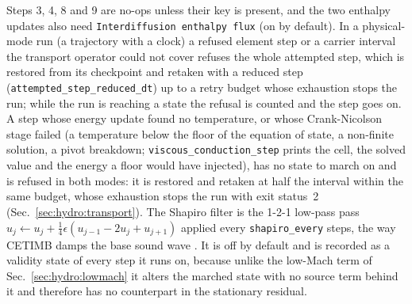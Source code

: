 %
Steps 3, 4, 8 and 9 are no-ops unless their key is present, and the two
enthalpy updates also need \texttt{Interdiffusion enthalpy flux} (on by
default).  In a physical-mode run (a trajectory with a clock) a refused element
step or a carrier interval the transport operator could not cover refuses the
whole attempted step, which is restored from its checkpoint and retaken
with a reduced step (\texttt{attempted\_step\_reduced\_dt}) up to a retry
budget whose exhaustion stops the run; while
the run is reaching a state the refusal is counted and the step goes on.  A
step whose energy update found no temperature, or whose Crank-Nicolson stage
failed (a temperature below the floor of the equation of state, a non-finite
solution, a pivot breakdown; \texttt{viscous\_conduction\_step} prints the
cell, the solved value and the energy a floor would have injected), has no
state to march on and is refused in both modes: it is restored and retaken
at half the interval within the same budget, whose exhaustion stops the run
with exit status~2 (Sec.~\ref{sec:hydro:transport}).  The Shapiro
filter is the 1-2-1 low-pass pass
$u_j \leftarrow u_j + \tfrac14\epsilon(u_{j-1} - 2u_j + u_{j+1})$ applied
every \texttt{shapiro\_every} steps, the way CETIMB damps the base sound wave
\citep{Koskinen2013}.  It is off by default and is recorded as a validity
state of every step it runs on, because unlike the low-Mach term of
Sec.~\ref{sec:hydro:lowmach} it alters the marched state with no source term
behind it and therefore has no counterpart in the stationary residual.

